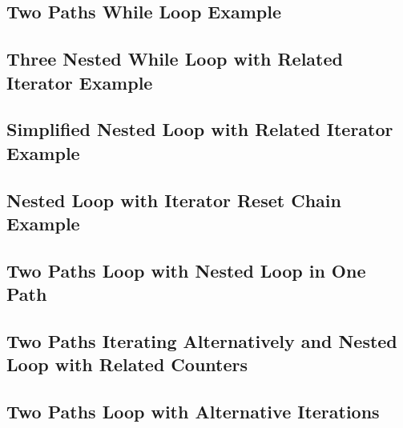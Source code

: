 \subsection{Two Paths While Loop Example}

\subsection{Three Nested While Loop with Related Iterator Example}

\subsection{Simplified Nested Loop with Related Iterator Example}

\subsection{Nested Loop with Iterator Reset Chain Example}

\subsection{Two Paths Loop with Nested Loop in One Path}


\subsection{Two Paths Iterating Alternatively and Nested Loop with Related Counters}


\subsection{Two Paths Loop with Alternative Iterations}

